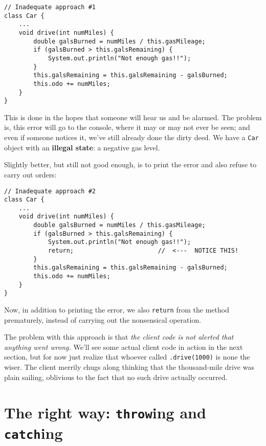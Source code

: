 \begin{Verbatim}[samepage=true,fontsize=\footnotesize,frame=single]
// Inadequate approach #1
class Car {
    ...
    void drive(int numMiles) {
        double galsBurned = numMiles / this.gasMileage;
        if (galsBurned > this.galsRemaining) {
            System.out.println("Not enough gas!!");
        }
        this.galsRemaining = this.galsRemaining - galsBurned;
        this.odo += numMiles;
    }
}
\end{Verbatim}

This is done in the hopes that someone will hear us and be alarmed. The
problem is, this error will go to the console, where it may or may not ever be
seen; and even if someone notices it, we've still already done the dirty deed.
We have a \texttt{Car} object with an \textbf{illegal state}: a negative gas
level.

Slightly better, but still not good enough, is to print the error and also
refuse to carry out orders:

\begin{Verbatim}[samepage=true,fontsize=\footnotesize,frame=single]
// Inadequate approach #2
class Car {
    ...
    void drive(int numMiles) {
        double galsBurned = numMiles / this.gasMileage;
        if (galsBurned > this.galsRemaining) {
            System.out.println("Not enough gas!!");
            return;                       //  <---  NOTICE THIS!
        }
        this.galsRemaining = this.galsRemaining - galsBurned;
        this.odo += numMiles;
    }
}
\end{Verbatim}

Now, in addition to printing the error, we also \texttt{return} from the
method prematurely, instead of carrying out the nonsensical operation.

The problem with this approach is that \textit{the client code is not alerted
that anything went wrong.} We'll see some actual client code in action in the
next section, but for now just realize that whoever called
\texttt{.drive(1000)} is none the wiser. The client merrily chugs along
thinking that the thousand-mile drive was plain sailing, oblivious to the fact
that no such drive actually occurred.

\section{The right way: \texttt{throw}ing and \texttt{catch}ing}

